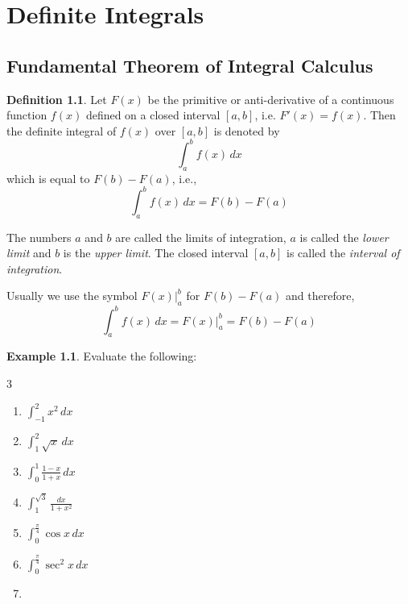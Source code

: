 \documentclass{book}
\theoremstyle{definition}
\newtheorem{definition}{Definition}[section]
\newtheorem{example}{Example}[section]
\begin{document}
\chapter{Definite Integrals}

\section {Fundamental Theorem of Integral Calculus}

\begin{definition}
Let $F(x)$ be the primitive or anti-derivative of a continuous function $f(x)$ defined on a closed interval $[a,b]$, i.e. $F'(x)=f(x)$. Then the definite integral of $f(x)$ over $[a,b]$ is denoted by 
\[
\int_{a}^{b}f(x)\,dx
\]
which is equal to $F(b)-F(a)$, i.e.,
\[
\int_{a}^{b}f(x)\,dx = F(b)-F(a)
\]

The numbers $a$ and $b$ are called the limits of integration, $a$ is called the \textit{lower limit} and $b$ is the \textit{upper limit}. The closed interval $[a,b]$ is called the \textit{interval of integration}.

Usually we use the symbol $\left.F(x)\right\vert _a^b$ for $F(b)-F(a)$ and therefore,
\[
\int_{a}^{b}f(x)\,dx = \left.F(x)\right\vert _a^b = F(b)-F(a)
\]
\end{definition}

\begin{example}
Evaluate the following:
\begin{multicols}{3}

\begin{enumerate}[label=(\roman*)]
    \item $\displaystyle\int _{-1}^{2}x^2 \, dx$
    \item $\displaystyle\int _{1}^{2} \sqrt{x}\, dx$
    \item $\displaystyle\int _{0}^{1} \frac{1-x}{1+x} \, dx$
    \item $\displaystyle\int _{1}^{\sqrt{3}} \frac{dx}{1+x^2}$
    \item $\displaystyle\int_0^{\frac{\pi}{4}}\cos x \, dx$
    \item $\displaystyle\int _0^{\frac{\pi}{4}}\sec^2 x \, dx$
    \item[] \phantom{x}
\end{enumerate}
\end{multicols}    
\end{example}
\end{document}
